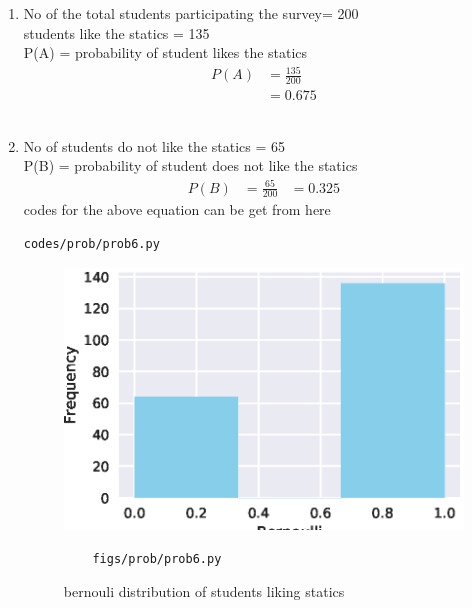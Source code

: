 \renewcommand{\theequation}{\theenumi}
\begin{enumerate}[label=\arabic*.,ref=\thesubsection.\theenumi]
\item No of the total students participating the survey=
200
\\
students like the statics = 135
\\
P(A) = probability of student likes the statics
\begin{align}
P\left(A\right) &= \frac{135}{200}
\\
&= 0.675
\end{align}
\\
\item No of students do not like the statics = 65
\\
P(B) = probability of student does not like the statics
\begin{align}
P\left(B\right) &= \frac{65}{200}
&= 0.325
\end{align} 
codes for the above equation can be get from here
\begin{lstlisting}
codes/prob/prob6.py
\end{lstlisting}
\begin{figure}[!ht]
	\centering
	\includegraphics[width=\columnwidth]{./figures/prob/prob6.eps}
	\caption{bernouli distribution of students liking statics }
	\label{fig:bt5}
	\begin{lstlisting}
	figs/prob/prob6.py
	\end{lstlisting}
\end{figure}
\end{enumerate}